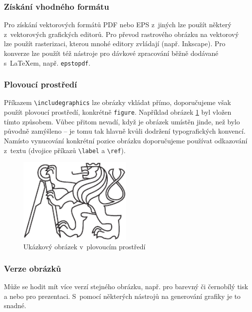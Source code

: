 \documentclass[thesis=B,czech]{FITthesis}[2011/06/14]
\begin{document}
 \subsubsection{Získání vhodného formátu}
 
 Pro získání vektorových formátů PDF nebo EPS z~jiných lze použít některý z~vektorových grafických editorů. Pro převod rastrového obrázku na vektorový lze použít rasterizaci, kterou mnohé editory zvládají (např. Inkscape). Pro konverze lze použít též nástroje pro dávkové zpracování běžně dodávané s~\LaTeX{}em, např. \verb|epstopdf|.
 
 \subsubsection{Plovoucí prostředí}
 
 Příkazem \verb|\includegraphics| lze obrázky vkládat přímo, doporučujeme však použít plovoucí prostředí, konkrétně \verb|figure|. Například obrázek \ref{fig:float} byl vložen tímto způsobem. Vůbec přitom nevadí, když je obrázek umístěn jinde, než bylo původně zamýšleno -- je tomu tak hlavně kvůli dodržení typografických konvencí. Namísto vynucování konkrétní pozice obrázku doporučujeme používat odkazování z~textu (dvojice příkazů \verb|\label| a \verb|\ref|).
 
 \begin{figure}[h]\centering
 	\includegraphics[width=0.5\textwidth, angle=30]{cvut-logo-bw}
 	\caption[Příklad obrázku]{Ukázkový obrázek v~plovoucím prostředí}\label{fig:float}
 \end{figure}
 
 \subsubsection{Verze obrázků}
 
 Může se hodit mít více verzí stejného obrázku, např. pro barevný či černobílý tisk a nebo pro prezentaci. S~pomocí některých nástrojů na generování grafiky je to snadné.
 
\end{document}
